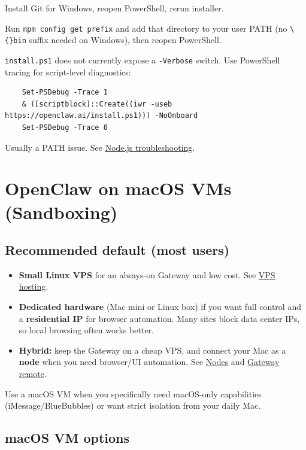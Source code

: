 Install Git for Windows, reopen PowerShell, rerun installer.

Run \texttt{npm config get prefix} and add that directory to your user PATH (no \texttt{\textbackslash\{\}bin} suffix needed on Windows), then reopen PowerShell.

\texttt{install.ps1} does not currently expose a \texttt{-Verbose} switch.
Use PowerShell tracing for script-level diagnostics:

\begin{lstlisting}
    Set-PSDebug -Trace 1
    & ([scriptblock]::Create((iwr -useb https://openclaw.ai/install.ps1))) -NoOnboard
    Set-PSDebug -Trace 0
\end{lstlisting}



Usually a PATH issue. See \href{/install/node\#troubleshooting}{Node.js troubleshooting}.


\clearpage

\section{OpenClaw on macOS VMs (Sandboxing)}


\subsection{Recommended default (most users)}


\begin{itemize}
  \item \textbf{Small Linux VPS} for an always-on Gateway and low cost. See \href{/vps}{VPS hosting}.
  \item \textbf{Dedicated hardware} (Mac mini or Linux box) if you want full control and a \textbf{residential IP} for browser automation. Many sites block data center IPs, so local browsing often works better.
  \item \textbf{Hybrid:} keep the Gateway on a cheap VPS, and connect your Mac as a \textbf{node} when you need browser/UI automation. See \href{/nodes}{Nodes} and \href{/gateway/remote}{Gateway remote}.
\end{itemize}


Use a macOS VM when you specifically need macOS-only capabilities (iMessage/BlueBubbles) or want strict isolation from your daily Mac.

\subsection{macOS VM options}


